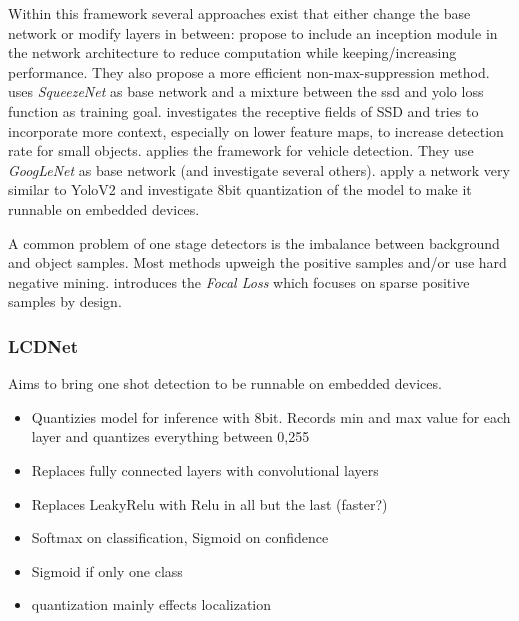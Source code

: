 	Within this framework several approaches exist that either change the base network or modify layers in between: \cite{ChengchengNing2017} propose to include an inception module in the network architecture to reduce computation while keeping/increasing performance. They also propose a more efficient non-max-suppression method. \cite{Wu} uses \textit{SqueezeNet} as base network and a mixture between the ssd and yolo loss function as training goal. \cite{Xiang} investigates the receptive fields of SSD and tries to incorporate more context, especially on lower feature maps, to increase detection rate for small objects.\cite{Linb} applies the framework for vehicle detection. They use \textit{GoogLeNet} as base network (and investigate several others).\cite{TripathiSanDiego} apply a network very similar to YoloV2 and investigate 8bit quantization of the model to make it runnable on embedded devices.
	
	A common problem of one stage detectors is the imbalance between background and object samples. Most methods upweigh the positive samples and/or use hard negative mining. \cite{Lin} introduces the \textit{Focal Loss} which focuses on sparse positive samples by design.
	
	\subsubsection{LCDNet\cite{TripathiSanDiego}}
	
	Aims to bring one shot detection to be runnable on embedded devices.
	
	\begin{itemize}
		\item Quantizies model for inference with 8bit. Records min and max value for each layer and quantizes everything between 0,255
		\item Replaces fully connected layers with convolutional layers
		\item Replaces LeakyRelu with Relu in all but the last (faster?)
		\item Softmax on classification, Sigmoid on confidence
		\item Sigmoid if only one class
		\item quantization mainly effects localization
	\end{itemize}
	
	\subsection{\cite{Linb}}
	
